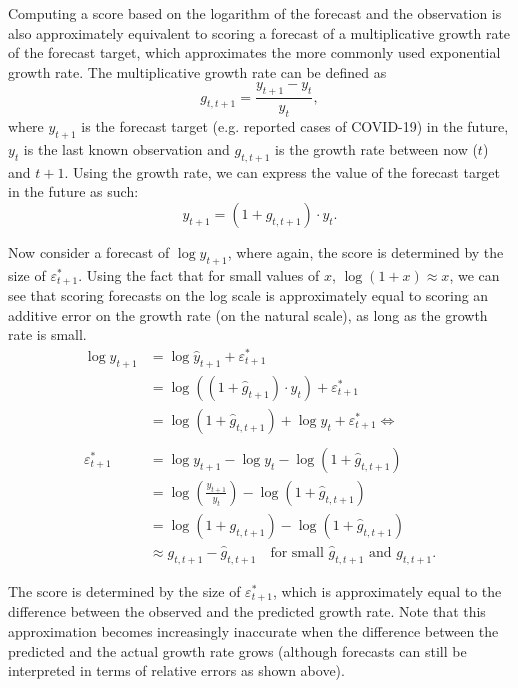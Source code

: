 \documentclass{article}
\begin{document}
Computing a score based on the logarithm of the forecast and the observation is also approximately equivalent to scoring a forecast of a multiplicative growth rate of the forecast target, which approximates the more commonly used exponential growth rate. The multiplicative growth rate can be defined as
%
\begin{equation}
    g_{t, t+1} = \frac{y_{t+1} - y_t}{y_t},
\end{equation}
%
where $y_{t+1}$ is the forecast target (e.g. reported cases of COVID-19) in the future, $y_t$ is the last known observation and $g_{t, t+1}$ is the growth rate between now ($t$) and $t+1$. 
Using the growth rate, we can express the value of the forecast target in the future as such: 
%
\begin{equation}
y_{t+1} = (1 + g_{t, t+1}) \cdot y_t.
\end{equation}
%

Now consider a forecast of $\log y_{t+1}$, where again, the score is determined by the size of $\varepsilon^*_{t+1}$. Using the fact that for small values of $x$, $\log (1+ x) \approx x$, we can see that scoring forecasts on the log scale is approximately equal to scoring an additive error on the growth rate (on the natural scale), as long as the growth rate is small.
%
\begin{align}
\log y_{t+1}        &= \log \hat{y}_{t+1} + \varepsilon^*_{t+1} \nonumber\\
                    &= \log ((1 + \hat{g}_{t+1}) \cdot y_{t}) + \varepsilon^*_{t+1} \\
                    &= \log (1 + \hat{g}_{t, t+1}) + \log y_t + \varepsilon^*_{t+1} \Leftrightarrow \nonumber \\
\nonumber \\
\varepsilon^*_{t+1}  &= \log y_{t+1} -  \log y_t - \log (1 + \hat{g}_{t, t+1}) \nonumber \\    
                    &= \log \left(\frac{y_{t+1}}{y_t}\right) - \log (1 + \hat{g}_{t, t+1}) \\    
                    &= \log (1 + g_{t, t+1}) - \log (1 + \hat{g}_{t, t+1})\nonumber  \\   
                    &\approx g_{t, t+1} - \hat{g}_{t, t+1} \quad \text{for small } \hat{g}_{t, t+1} \text{ and } g_{t, t+1}. \nonumber
\end{align}

The score is determined by the size of $\varepsilon^*_{t+1}$, which is approximately equal to the difference between the observed and the predicted growth rate. Note that this approximation becomes increasingly inaccurate when the difference between the predicted and the actual growth rate grows (although forecasts can still be interpreted in terms of relative errors as shown above). %
\end{document}
